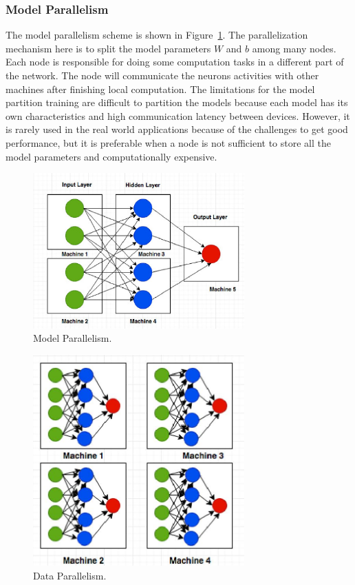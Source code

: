 \documentclass[conference]{IEEEtran}
\begin{document}
\subsubsection{Model Parallelism}
\label{sec:mp}

The model parallelism scheme is shown in Figure~\ref{fig:Model_Para}. The parallelization mechanism here is to split the model parameters $W$ and $b$ among many nodes. Each node is responsible for doing some computation tasks in a different part of the network. The node will communicate the neurons activities with other machines after finishing local computation. The limitations for the model partition training are difficult to partition the models because each model has its own characteristics and high communication latency between devices. However, it is rarely used in the real world applications because of the challenges to get good performance, but it is preferable when a node is not sufficient to store all the model parameters and computationally expensive.

\begin{figure}[htb]
  \includegraphics[width=3.2in]{Fig/Model_Para.jpg}
  \caption{Model Parallelism.}
  \label{fig:Model_Para}
\end{figure}

\begin{figure}[htb]
  \includegraphics[width=3.2in]{Fig/Data_Para.jpg}
  \caption{Data Parallelism.}
  \label{fig:Data_Para}
\end{figure}
\end{document}
